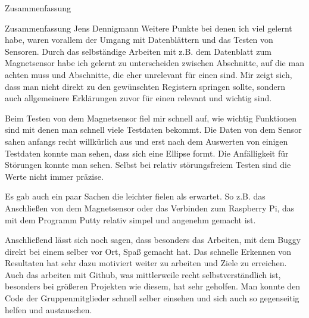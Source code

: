\documentclass[12pt]{report}
\begin{document}
\begin{section}{Zusammenfassung}
\begin{subsection}{Zusammenfassung Jens Dennigmann}
  Weitere Punkte bei denen ich viel gelernt habe, waren vorallem der Umgang mit Datenblättern 
  und das Testen von Sensoren. Durch das selbständige Arbeiten mit z.B. dem Datenblatt zum 
  Magnetsensor habe ich gelernt zu unterscheiden zwischen Abschnitte, auf die
  man achten muss und Abschnitte, die eher unrelevant für einen sind. Mir zeigt
  sich, dass man nicht direkt zu den gewünschten Registern springen sollte, sondern auch 
  allgemeinere Erklärungen zuvor für einen relevant und wichtig sind.
  
  Beim Testen von dem Magnetsensor fiel mir schnell auf, wie wichtig Funktionen sind mit denen 
  man schnell viele Testdaten bekommt. Die Daten von dem Sensor sahen anfangs recht willkürlich 
  aus und erst nach dem Auswerten von einigen Testdaten konnte man sehen, dass sich eine 
  Ellipse formt. Die Anfälligkeit für Störungen konnte man sehen. Selbst bei
  relativ störungsfreiem Testen sind die Werte nicht immer präzise.
  
  Es gab auch ein paar Sachen die leichter fielen als erwartet. So z.B. das
  Anschließen von dem Magnetsensor oder das Verbinden zum Raspberry Pi, das mit dem Programm Putty relativ simpel 
  und angenehm gemacht ist. 
  
  Anschließend lässt sich noch sagen, dass besonders das Arbeiten, mit dem Buggy direkt bei 
  einem selber vor Ort, Spaß gemacht hat. Das schnelle Erkennen von Resultaten hat sehr dazu 
  motiviert weiter zu arbeiten und Ziele zu erreichen. Auch das arbeiten mit Github, was 
  mittlerweile recht selbstverständlich ist, besonders bei größeren Projekten wie diesem, hat 
  sehr geholfen. Man konnte den Code der Gruppenmitglieder schnell selber einsehen und sich 
  auch so gegenseitig helfen und austauschen.
  \end{subsection}
\end{section}
\end{document}
